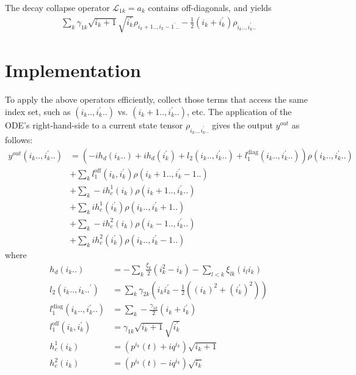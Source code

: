 \documentclass[letterpaper]{article}
\newcommand{\Ell}{\mathcal{L}}
\begin{document}
\begin{enumerate}
    The decay collapse operator $\Ell_{1k} = a_k$ contains off-diagonals, and yields
    \begin{align}
        \sum_k \gamma_{1k} \sqrt{i_k+1}\sqrt{i_k^\prime} \rho_{i_k+1.., i_k-1^\prime..} - \frac 12 \left( i_k+ i_k^\prime \right)\rho_{i_k.., i_k^\prime..} 
    \end{align}
      
\end{enumerate}

\section{Implementation}

  To apply the above operators efficiently, collect those terms that access the same index set, such as $(i_k..,i_k^\prime..)$ vs. $(i_k+1.., i_k^\prime..)$, etc. The application of the ODE's right-hand-side to a current state tensor $\rho_{i_k..,i_k^\prime..}$ gives the output $y^{out}$ as follows:
  \begin{align}
       y^{out}(i_k..,i_k^\prime..)  &= 
       \left(-i h_d(i_k..) + ih_d(i_k^\prime)
        + l_2(i_k..,i_k^\prime..) + l_1^{\text{diag}}(i_k.., i_k^\prime..) \right) \rho(i_k..,i_k^\prime..) \\
        &+ \sum_k l_1^{\text{off}}(i_k, i_k^\prime) \rho(i_k+1.., i_k^\prime -1..)\\
        &+ \sum_k -i h_c^1(i_k) \rho(i_k+1.., i_k^\prime..) \\
        &+ \sum_k ih_c^1(i_k^\prime) \rho(i_k..,i_k^\prime +1 ..) \\
        &+ \sum_k -i h_c^2(i_k) \rho(i_k-1.., i_k^\prime..) \\
        &+ \sum_k ih_c^2(i_k^\prime) \rho(i_k..,i_k^\prime -1 ..) 
  \end{align}
  where 
  \begin{align}
    h_d(i_k..) &= -\sum_k \frac{\xi_k}{2}(i_k^2 - i_k) - \sum_{l<k} \xi_{lk} (i_l i_k) \\
    l_2(i_k..,i_k..^\prime) &= \sum_k \gamma_{2k} \left(i_ki_k^\prime - \frac 12 \left( (i_k)^2 + (i_k^\prime)^2\right) \right)\\
    l_1^{\text{diag}}(i_k.., i_k^\prime..) &= \sum_k -\frac{\gamma_{1k}}{2}\left(i_k + i_k^\prime\right) \\
    l_1^{\text{off}}(i_k,i_k^\prime) &= \gamma_{1k} \sqrt{i_k+1}\sqrt{i_k^\prime} \\
    h_c^1(i_k) &= \left(p^{i_k}(t) + iq^{i_k}\right)\sqrt{i_k+1} \\
    h_c^2(i_k) &= \left(p^{i_k}(t) - iq^{i_k}\right)\sqrt{i_k} 
  \end{align}
  
\end{document}
